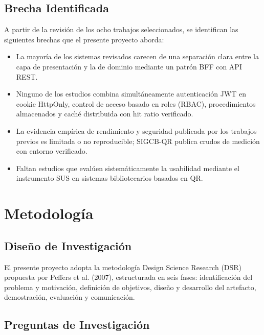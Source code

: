 \documentclass[
11pt,
a4paper,
]{report}
\begin{document}
	\hypertarget{brecha-identificada}{%
		\section{Brecha Identificada}\label{brecha-identificada}}
	
	A partir de la revisión de los ocho trabajos seleccionados, se identifican las siguientes brechas que el presente proyecto aborda:
	
	\begin{itemize}
		\item La mayoría de los sistemas revisados carecen de una separación clara entre la capa de presentación y la de dominio mediante un patrón BFF con API REST.
		\item Ninguno de los estudios combina simultáneamente autenticación JWT en cookie HttpOnly, control de acceso basado en roles (RBAC), procedimientos almacenados y caché distribuida con hit ratio verificado.
		\item La evidencia empírica de rendimiento y seguridad publicada por los trabajos previos es limitada o no reproducible; SIGCB-QR publica crudos de medición con entorno verificado.
		\item Faltan estudios que evalúen sistemáticamente la usabilidad mediante el instrumento SUS en sistemas bibliotecarios basados en QR.
	\end{itemize}
	
	\hypertarget{metodologia}{%
		\chapter{Metodología}\label{metodologia}}
	
	\hypertarget{diseno-de-investigacion}{%
		\section{Diseño de Investigación}\label{diseno-de-investigacion}}
	
	El presente proyecto adopta la metodología Design Science Research (DSR) propuesta por Peffers et al. (2007), estructurada en seis fases: identificación del problema y motivación, definición de objetivos, diseño y desarrollo del artefacto, demostración, evaluación y comunicación.
	
	\hypertarget{preguntas-de-investigacion}{%
		\section{Preguntas de Investigación}\label{preguntas-de-investigacion}}
	
\end{document}
